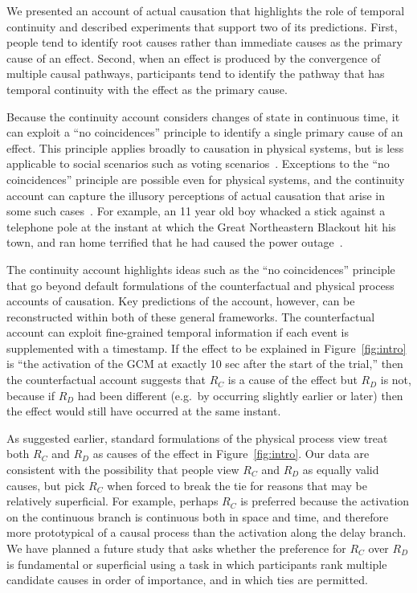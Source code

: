 \documentclass[10pt,letterpaper]{article}
\newcommand{\ev}[2]{$#1_#2$}
\begin{document}
We presented an account of actual causation that highlights the role of temporal continuity and described experiments that support two of its predictions. First, people tend to identify root causes rather than immediate causes as the primary cause of an effect. Second, when an effect is produced by the convergence of multiple causal pathways, participants tend to identify the pathway that has temporal continuity with the effect as the primary cause.

Because the continuity account considers changes of state in continuous time, it can exploit a ``no coincidences'' principle to identify a single primary cause of an effect. This principle applies broadly to causation in physical systems, but is less applicable to social scenarios such as voting scenarios~\cite{livengood13}. Exceptions to the ``no coincidences'' principle are possible even for physical systems, and the continuity account can capture the illusory perceptions of actual causation that arise in some such cases~\cite{thorstadw16}. For example, an 11 year old boy whacked a stick against a telephone pole at the instant at which the Great Northeastern Blackout hit his town, and ran home terrified that he had caused the power outage~\cite{gelbr1965night}. 

The continuity account highlights ideas such as the ``no coincidences'' principle that go beyond default formulations of the counterfactual and physical process accounts of causation. Key predictions of the account, however, can be reconstructed within both of these general frameworks. The counterfactual account can exploit fine-grained temporal information if each event is supplemented with a timestamp. If the effect to be explained in Figure~\ref{fig:intro} is ``the activation of the GCM at exactly 10 sec after the start of the trial,'' then the counterfactual account suggests that \ev{R}{C} is a cause of the effect but \ev{R}{D} is not, because if \ev{R}{D} had been different (e.g.\ by occurring slightly earlier or later) then the effect would still have occurred at the same instant.

As suggested earlier, standard formulations of the physical process view treat both \ev{R}{C} and \ev{R}{D} as causes of the effect in Figure~\ref{fig:intro}. Our data are consistent with the possibility that people view \ev{R}{C} and \ev{R}{D} as equally valid causes, but pick \ev{R}{C} when forced to break the tie for reasons that may be relatively superficial. For example, perhaps \ev{R}{C} is preferred because the activation on the continuous branch is continuous both in space and time, and therefore more prototypical of a causal process than the activation along the delay branch. We have planned a future study that asks whether the preference for \ev{R}{C} over \ev{R}{D} is fundamental or superficial using a task in which participants rank multiple candidate causes in order of importance, and in which ties are permitted. 
\end{document}
